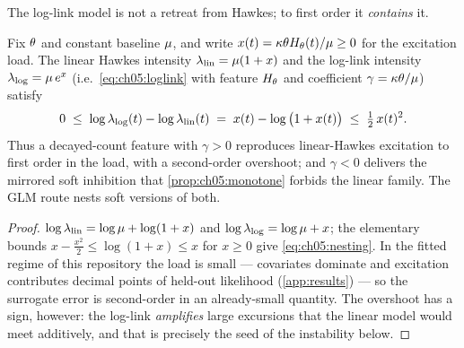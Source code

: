 The log-link model is not a retreat from Hawkes; to first order it
\emph{contains} it.

\begin{proposition}\label{prop:ch05:nesting}
Fix $\theta$ and constant baseline $\mu$, and write $x(t) =
\kappa\theta H_{\theta}(t)/\mu \ge 0$ for the excitation load. The
linear Hawkes intensity $\lambda_{\mathrm{lin}} = \mu(1 + x)$ and the
log-link intensity $\lambda_{\mathrm{log}} = \mu\, e^{x}$ (i.e.\
\cref{eq:ch05:loglink} with feature $H_\theta$ and coefficient $\gamma =
\kappa\theta/\mu$) satisfy
\begin{equation}\label{eq:ch05:nesting}
0 \;\le\; \log \lambda_{\mathrm{log}}(t) - \log \lambda_{\mathrm{lin}}(t)
\;=\; x(t) - \log\big(1 + x(t)\big) \;\le\; \tfrac{1}{2}\,x(t)^2 .
\end{equation}
Thus a decayed-count feature with $\gamma > 0$ reproduces linear-Hawkes
excitation to first order in the load, with a second-order overshoot; and
$\gamma < 0$ delivers the mirrored soft inhibition that
\cref{prop:ch05:monotone} forbids the linear family. The GLM route nests
soft versions of both.
\end{proposition}

\begin{proof}
$\log\lambda_{\mathrm{lin}} = \log\mu + \log(1+x)$ and
$\log\lambda_{\mathrm{log}} = \log\mu + x$; the elementary bounds $x -
\tfrac{x^2}{2} \le \log(1+x) \le x$ for $x \ge 0$ give
\cref{eq:ch05:nesting}. In the fitted regime of this repository the load
is small --- covariates dominate and excitation contributes decimal
points of held-out likelihood (\cref{app:results}) --- so the surrogate
error is second-order in an already-small quantity. The overshoot has a
sign, however: the log-link \emph{amplifies} large excursions that the
linear model would meet additively, and that is precisely the seed of the
instability below.
\end{proof}

